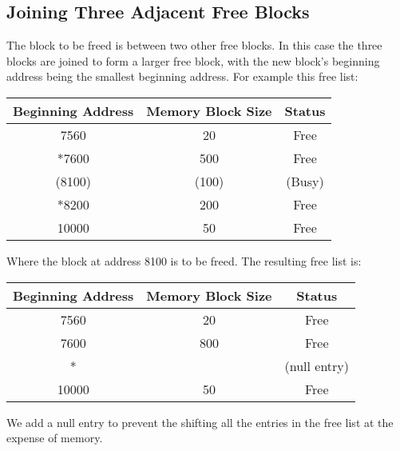 \documentclass[12pt letter]{report}
\begin{document}
\subsection{Joining Three Adjacent Free Blocks}
The block to be freed is between two other free blocks. In this case the three blocks are joined to form a larger free block, with the new block's beginning address being the smallest beginning address. For example this free list:
\begin{table}[H]
  \begin{center}
    \begin{tabular}{|c c c|}
      \hline
      Beginning Address & Memory Block Size & Status \\ [0.5ex]
      \hline
      \hline
      7560              & 20                & Free   \\
      *7600             & 500               & Free   \\
      (8100)            & (100)             & (Busy) \\
      *8200             & 200               & Free   \\
      10000             & 50                & Free   \\
      \hline
    \end{tabular}
  \end{center}
\end{table}
Where the block at address 8100 is to be freed. The resulting free list is:
\begin{table}[H]
  \begin{center}
    \begin{tabular}{|c c c|}
      \hline
      Beginning Address & Memory Block Size & Status       \\ [0.5ex]
      \hline
      \hline
      7560              & 20                & Free         \\
      7600              & 800               & Free         \\
      *                 &                   & (null entry) \\
      10000             & 50                & Free         \\
      \hline
    \end{tabular}
  \end{center}
\end{table}
We add a null entry to prevent the shifting all the entries in the free list at the expense of memory.
\end{document}
